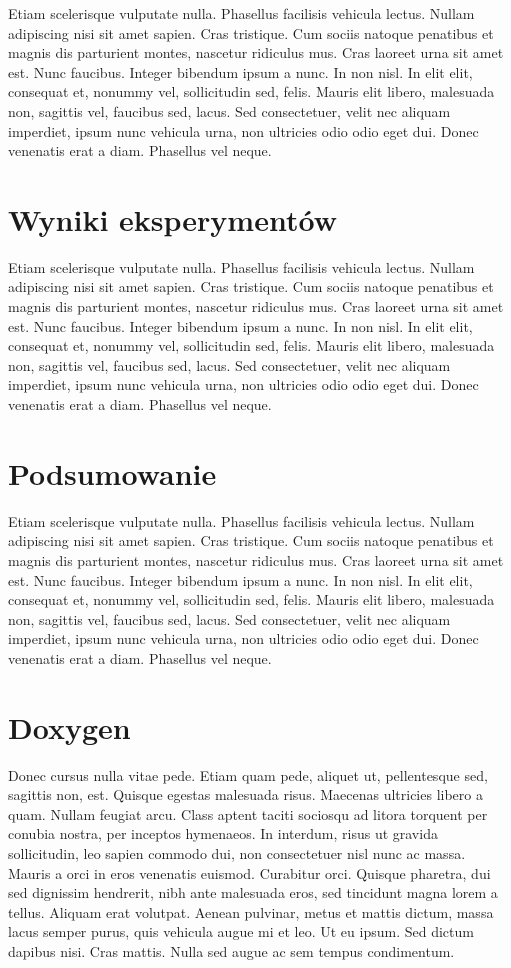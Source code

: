 \documentclass[eng,printmode]{mgr}
\begin{document}
Etiam scelerisque vulputate nulla. Phasellus facilisis vehicula lectus. Nullam adipiscing nisi sit amet sapien. Cras tristique. Cum sociis natoque penatibus et magnis dis parturient montes, nascetur ridiculus mus. Cras laoreet urna sit amet est. Nunc faucibus. Integer bibendum ipsum a nunc. In non nisl. In elit elit, consequat et, nonummy vel, sollicitudin sed, felis. Mauris elit libero, malesuada non, sagittis vel, faucibus sed, lacus. Sed consectetuer, velit nec aliquam imperdiet, ipsum nunc vehicula urna, non ultricies odio odio eget dui. Donec venenatis erat a diam. Phasellus vel neque.

\chapter{Wyniki eksperymentów}

Etiam scelerisque vulputate nulla. Phasellus facilisis vehicula lectus. Nullam adipiscing nisi sit amet sapien. Cras tristique. Cum sociis natoque penatibus et magnis dis parturient montes, nascetur ridiculus mus. Cras laoreet urna sit amet est. Nunc faucibus. Integer bibendum ipsum a nunc. In non nisl. In elit elit, consequat et, nonummy vel, sollicitudin sed, felis. Mauris elit libero, malesuada non, sagittis vel, faucibus sed, lacus. Sed consectetuer, velit nec aliquam imperdiet, ipsum nunc vehicula urna, non ultricies odio odio eget dui. Donec venenatis erat a diam. Phasellus vel neque.

\chapter{Podsumowanie}
Etiam scelerisque vulputate nulla. Phasellus facilisis vehicula lectus. Nullam adipiscing nisi sit amet sapien. Cras tristique. Cum sociis natoque penatibus et magnis dis parturient montes, nascetur ridiculus mus. Cras laoreet urna sit amet est. Nunc faucibus. Integer bibendum ipsum a nunc. In non nisl. In elit elit, consequat et, nonummy vel, sollicitudin sed, felis. Mauris elit libero, malesuada non, sagittis vel, faucibus sed, lacus. Sed consectetuer, velit nec aliquam imperdiet, ipsum nunc vehicula urna, non ultricies odio odio eget dui. Donec venenatis erat a diam. Phasellus vel neque.

\appendix
\chapter{Doxygen}
Donec cursus nulla vitae pede. Etiam quam pede, aliquet ut, pellentesque sed, sagittis non, est. Quisque egestas malesuada risus. Maecenas ultricies libero a quam. Nullam feugiat arcu. Class aptent taciti sociosqu ad litora torquent per conubia nostra, per inceptos hymenaeos. In interdum, risus ut gravida sollicitudin, leo sapien commodo dui, non consectetuer nisl nunc ac massa. Mauris a orci in eros venenatis euismod. Curabitur orci. Quisque pharetra, dui sed dignissim hendrerit, nibh ante malesuada eros, sed tincidunt magna lorem a tellus. Aliquam erat volutpat. Aenean pulvinar, metus et mattis dictum, massa lacus semper purus, quis vehicula augue mi et leo. Ut eu ipsum. Sed dictum dapibus nisi. Cras mattis. Nulla sed augue ac sem tempus condimentum.
\end{document}
